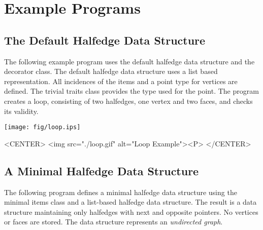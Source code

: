 \clearpage
\section{Example Programs}
\label{sectionHdsExamples}


\subsection{The Default Halfedge Data Structure}

The following example program uses the default halfedge data structure
and the decorator class. The default halfedge data structure uses a
list based representation. All incidences of the items and a point
type for vertices are defined. The trivial traits class provides the
type used for the point. The program creates a loop, consisting
of two halfedges, one vertex and two faces, and checks its validity.

\begin{ccTexOnly}
    \vspace{-4mm}
    \begin{center}
      \parbox{0.3\textwidth}{%
          \texttt{[image: fig/loop.ips]}%
      }
    \end{center}
    \vspace{-3mm}
\end{ccTexOnly}

\begin{ccHtmlOnly}
    <CENTER>
      <img src="./loop.gif" alt="Loop Example"><P>
    </CENTER>
\end{ccHtmlOnly}



\subsection{A Minimal Halfedge Data Structure}

The following program defines a minimal halfedge data structure using
the minimal items class  and a
list-based halfedge data structure. The result is a data structure
maintaining only halfedges with next and opposite pointers.  No
vertices or faces are stored. The data structure represents an {\em
  undirected graph}.

